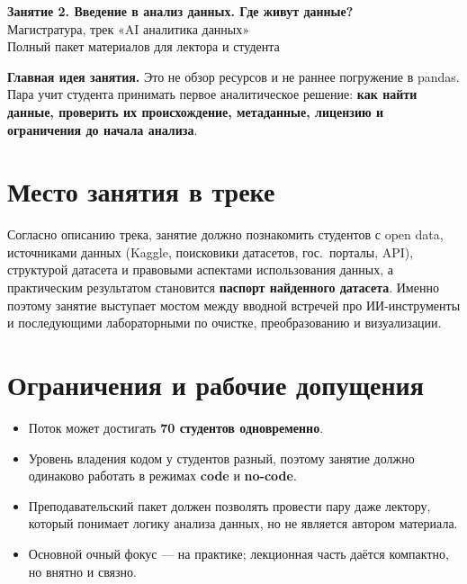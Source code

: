 \documentclass[11pt,a4paper]{article}
\begin{document}
\begin{center}
{\LARGE \textbf{Занятие 2. Введение в анализ данных. Где живут данные?}}\\[0.4em]
{\large Магистратура, трек «AI аналитика данных»}\\[0.6em]
{\normalsize Полный пакет материалов для лектора и студента}
\end{center}

\vspace{0.6em}

\noindent\colorbox{Soft}{\parbox{\dimexpr\linewidth-2\fboxsep}{
\textbf{Главная идея занятия.}
Это не обзор ресурсов и не раннее погружение в pandas. Пара учит студента принимать первое аналитическое решение: \textbf{как найти данные, проверить их происхождение, метаданные, лицензию и ограничения до начала анализа}.
}}

\section{Место занятия в треке}

Согласно описанию трека, занятие должно познакомить студентов с open data, источниками данных (Kaggle, поисковики датасетов, гос.\ порталы, API), структурой датасета и правовыми аспектами использования данных, а практическим результатом становится \textbf{паспорт найденного датасета}. Именно поэтому занятие выступает мостом между вводной встречей про ИИ-инструменты и последующими лабораторными по очистке, преобразованию и визуализации.

\section{Ограничения и рабочие допущения}

\begin{itemize}[leftmargin=1.2em]
\item Поток может достигать \textbf{70 студентов одновременно}.
\item Уровень владения кодом у студентов разный, поэтому занятие должно одинаково работать в режимах \textbf{code} и \textbf{no-code}.
\item Преподавательский пакет должен позволять провести пару даже лектору, который понимает логику анализа данных, но не является автором материала.
\item Основной очный фокус --- на практике; лекционная часть даётся компактно, но внятно и связно.
\end{itemize}
\end{document}
